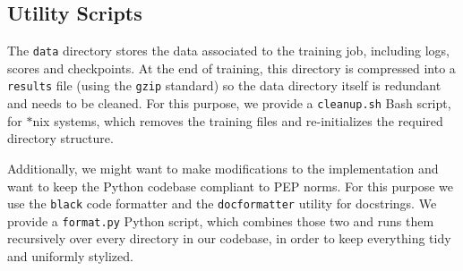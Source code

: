 \subsection*{Utility Scripts}
The \verb|data| directory stores the data associated to the training job, including logs, scores and checkpoints.
At the end of training, this directory is compressed into a \verb|results| file (using the \verb|gzip| standard) so the data directory itself is redundant and needs to be cleaned.
For this purpose, we provide a \verb|cleanup.sh| Bash script, for $*$nix systems, which removes the training files and re-initializes the required directory structure.

Additionally, we might want to make modifications to the implementation and want to keep the Python codebase compliant to PEP norms.
For this purpose we use the \verb|black| code formatter and the \verb|docformatter| utility for docstrings.
We provide a \verb|format.py| Python script, which combines those two and runs them recursively over every directory in our codebase, in order to keep everything tidy and uniformly stylized.

